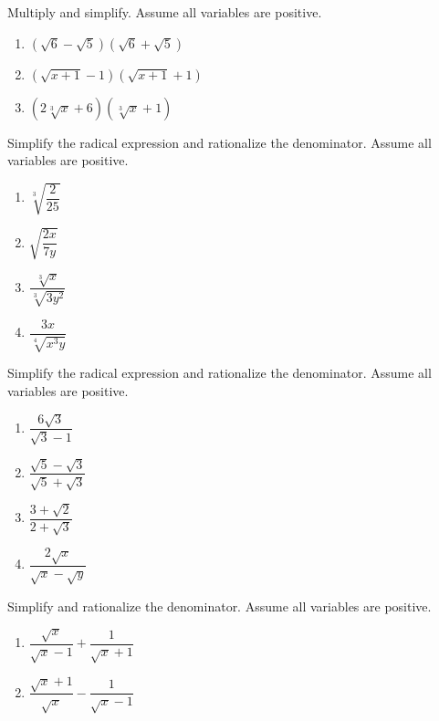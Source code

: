 \documentclass[
  en,11pt]{elegantbook}
\let\BeginKnitrBlock\begin \let\EndKnitrBlock\end
\begin{document}
\BeginKnitrBlock{exercise}
\protect\hypertarget{exr:unnamed-chunk-102}{}{\label{exr:unnamed-chunk-102} }
Multiply and simplify. Assume all variables are positive.

\begin{enumerate}
\def\labelenumi{\arabic{enumi}.}

\item
  \((\sqrt6-\sqrt5)(\sqrt6+\sqrt5)\)
\item
  \((\sqrt{x+1}-1)(\sqrt{x+1}+1)\)
\item
  \((2\sqrt[3]x+6)(\sqrt[3]x+1)\)
\end{enumerate}
\EndKnitrBlock{exercise}

\BeginKnitrBlock{exercise}
\protect\hypertarget{exr:unnamed-chunk-103}{}{\label{exr:unnamed-chunk-103} }
Simplify the radical expression and rationalize the denominator. Assume all variables are positive.

\begin{enumerate}
\def\labelenumi{\arabic{enumi}.}

\item
  \(\sqrt[3]{\dfrac2{25}}\)
\item
  \(\sqrt{\dfrac{2x}{7y}}\)
\item
  \(\dfrac{\sqrt[3]{x}}{\sqrt[3]{3y^2}}\)
\item
  \(\dfrac{3x}{\sqrt[4]{x^3y}}\)
\end{enumerate}
\EndKnitrBlock{exercise}

\BeginKnitrBlock{exercise}
\protect\hypertarget{exr:unnamed-chunk-104}{}{\label{exr:unnamed-chunk-104} }
Simplify the radical expression and rationalize the denominator. Assume all variables are positive.

\begin{enumerate}
\def\labelenumi{\arabic{enumi}.}

\item
  \(\dfrac{6\sqrt3}{\sqrt3-1}\)
\item
  \(\dfrac{\sqrt5-\sqrt3}{\sqrt5+\sqrt3}\)
\item
  \(\dfrac{3+\sqrt2}{2+\sqrt3}\)
\item
  \(\dfrac{2\sqrt{x}}{\sqrt x- \sqrt y}\)
\end{enumerate}
\EndKnitrBlock{exercise}

\BeginKnitrBlock{exercise}
\protect\hypertarget{exr:unnamed-chunk-105}{}{\label{exr:unnamed-chunk-105} }
Simplify and rationalize the denominator. Assume all variables are positive.

\begin{enumerate}
\def\labelenumi{\arabic{enumi}.}

\item
  \(\dfrac{\sqrt{x}}{\sqrt x-1}+\dfrac{1}{\sqrt{x}+1}\)
\item
  \(\dfrac{\sqrt{x}+1}{\sqrt x}-\dfrac{1}{\sqrt{x}-1}\)
\end{enumerate}
\EndKnitrBlock{exercise}
\end{document}
